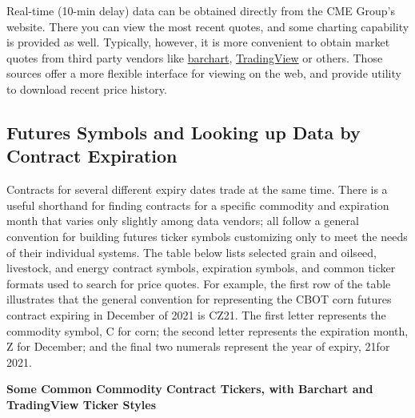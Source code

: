 \documentclass[
  letterpaper,
  DIV=11,
  numbers=noendperiod]{scrreprt}
\begin{document}
Real-time (10-min delay) data can be obtained directly from the CME
Group's website. There you can view the most recent quotes, and some
charting capability is provided as well. Typically, however, it is more
convenient to obtain market quotes from third party vendors like
\href{http://www.barchart.com/futures/marketoverview}{barchart},
\href{https://www.tradingview.com/}{TradingView} or others. Those
sources offer a more flexible interface for viewing on the web, and
provide utility to download recent price history.

\hypertarget{futures-symbols-and-looking-up-data-by-contract-expiration}{%
\subsection{Futures Symbols and Looking up Data by Contract
Expiration}\label{futures-symbols-and-looking-up-data-by-contract-expiration}}

Contracts for several different expiry dates trade at the same time.
There is a useful shorthand for finding contracts for a specific
commodity and expiration month that varies only slightly among data
vendors; all follow a general convention for building futures ticker
symbols customizing only to meet the needs of their individual systems.
The table below lists selected grain and oilseed, livestock, and energy
contract symbols, expiration symbols, and common ticker formats used to
search for price quotes. For example, the first row of the table
illustrates that the general convention for representing the CBOT corn
futures contract expiring in December of 2021 is CZ21. The first letter
represents the commodity symbol, C for corn; the second letter
represents the expiration month, Z for December; and the final two
numerals represent the year of expiry, 21for 2021.

\textbf{Some Common Commodity Contract Tickers, with Barchart and
TradingView Ticker Styles}
\end{document}
